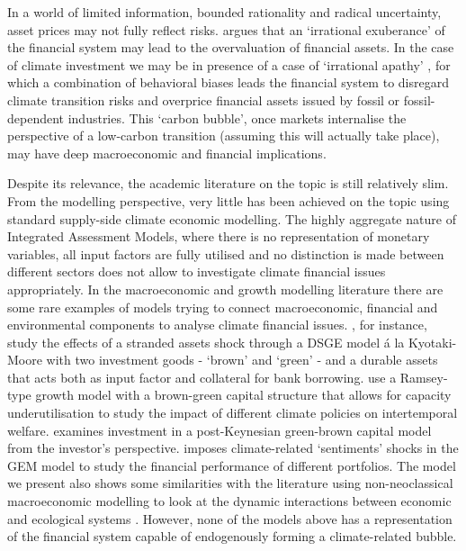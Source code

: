 \documentclass[authoryear]{article}
\begin{document}
In a world of limited information, bounded rationality and radical uncertainty, asset prices may not fully reflect risks. \citet{Shiller2015} argues that an `irrational exuberance' of the financial system may lead to the overvaluation of financial assets. In the case of climate investment we may be in presence of a case of `irrational apathy' \citep{Critchlow2015}, for which a combination of behavioral biases leads the financial system to disregard climate transition risks and overprice financial assets issued by fossil or fossil-dependent industries. This `carbon bubble', once markets internalise the perspective of a low-carbon transition (assuming this will actually take place), may have deep macroeconomic and financial implications.

Despite its relevance, the academic literature on the topic is still relatively slim. From the modelling perspective, very little has been achieved on the topic using standard supply-side climate economic modelling. The highly aggregate nature of Integrated Assessment Models, where there is no representation of monetary variables, all input factors are fully utilised and no distinction is made between different sectors \citep{Bowen2014} does not allow to investigate climate financial issues appropriately. In the macroeconomic and growth modelling literature there are some rare examples of models trying to connect macroeconomic, financial and environmental components to analyse climate financial issues. \citet{Comerford2015}, for instance, study the effects of a stranded assets shock through a DSGE model \'a la Kyotaki-Moore with two investment goods - `brown' and `green' - and a durable assets that acts both as input factor and collateral for bank borrowing. \citet{Rozenberg2014} use a Ramsey-type growth model with a brown-green capital structure that allows for capacity underutilisation to study the impact of different climate policies on intertemporal welfare. \citet{KempBenedict2014} examines investment in a post-Keynesian green-brown capital model from the investor's perspective. \citet{CISL2015} imposes climate-related `sentiments' shocks in the GEM model to study the financial performance of different portfolios. The model we present also shows some similarities with the literature using non-neoclassical macroeconomic modelling to look at the dynamic interactions between economic and ecological systems \citep{Dafermos2017, Berg2015, Taylor2016, Naqvi2015}. However, none of the models above has a representation of the financial system capable of endogenously forming a climate-related bubble.\\
\end{document}
